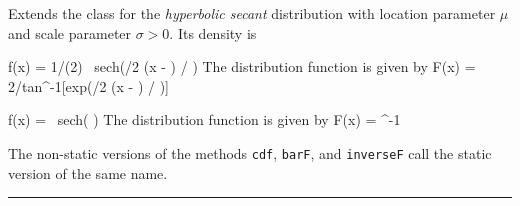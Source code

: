 
Extends the class  for
the {\em hyperbolic secant\/} distribution with location
parameter $\mu$ and scale parameter $\sigma > 0$.
Its density is
\begin{htmlonly}
\eq
   f(x) = 1/(2\sigma) \mbox{ sech}(\pi/2 (x - \mu) / \sigma)
\endeq
The distribution function is given by
\eq
   F(x) = 2/\pi tan^{-1}[exp(\pi/2 (x - \mu) / \sigma)]
\endeq
\end{htmlonly}%
\begin{latexonly}%
\eq
   f(x) =  \mbox{ sech}\left( \right)
\endeq
The distribution function is given by
\eq
   F(x) =  \tan^{-1}
\endeq
\end{latexonly}%

The non-static versions of the methods \texttt{cdf}, \texttt{barF},
and \texttt{inverseF} call the static version of the same name.


\bigskip\hrule

